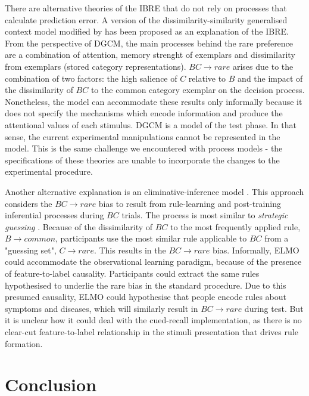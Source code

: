 \documentclass[10pt,letterpaper]{article}
\begin{document}
There are alternative theories of the IBRE that do not rely on processes that calculate prediction error.
A version of the dissimilarity-similarity generalised context model  modified by  has been proposed as an explanation of the IBRE.
From the perspective of DGCM, the main processes behind the rare preference are a combination of attention, memory strenght of exemplars and dissimilarity from exemplars (stored category representations).
$BC \to rare$ arises due to the combination of two factors: the high salience of $C$ relative to $B$ and the impact of the dissimilarity of $BC$ to the common category exemplar on the decision process.
Nonetheless, the model can accommodate these results only informally because it does not specify the mechanisms which encode information and produce the attentional values of each stimulus.
DGCM is a model of the test phase.
In that sense, the current experimental manipulations cannot be represented in the model.
This is the same challenge we encountered with process models - the specifications of these theories are unable to incorporate the changes to the experimental procedure.

Another alternative explanation is an eliminative-inference model \cite<ELMO, >{juslin2001high}.
This approach considers the $BC \to rare$ bias to result from rule-learning and post-training inferential processes during $BC$ trials.
The process is most similar to \textit{strategic guessing} \cite{kruschke1995extensions}.
Because of the dissimilarity of $BC$ to the most frequently applied rule, $B \to common$, participants use the most similar rule applicable to $BC$ from a "guessing set", $C \to rare$.
This results in the $BC \to rare$ bias.
Informally, ELMO could accommodate the observational learning paradigm, because of the presence of feature-to-label causality.
Participants could extract the same rules hypothesised to underlie the rare bias in the standard procedure.
Due to this presumed causality, ELMO could hypothesise that people encode rules about symptoms and diseases, which will similarly result in $BC \to rare$ during test.
But it is unclear how it could deal with the cued-recall implementation, as there is no clear-cut feature-to-label relationship in the stimuli presentation that drives rule formation.

\section{Conclusion}
\end{document}
